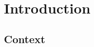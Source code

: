 

\chapter{Introduction}

\ifpdf
    \graphicspath{{1_introduction/figures/PNG/}{1_introduction/figures/PDF/}{1_introduction/figures/}}
\else
    \graphicspath{{1_introduction/figures/EPS/}{1_introduction/figures/}}
\fi







\section{Context} 



